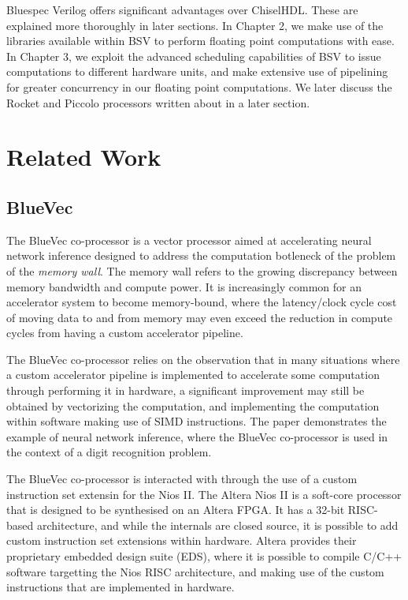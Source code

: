 \documentclass[a4paper,8pt]{report}
\begin{document}
Bluespec Verilog offers significant advantages over ChiselHDL. These are
explained more thoroughly in later sections. In Chapter 2, we make use of the
libraries available within BSV to perform floating point computations with ease.
In Chapter 3, we exploit the advanced scheduling capabilities of BSV to issue
computations to different hardware units, and make extensive use of pipelining
for greater concurrency in our floating point computations. We later discuss the
Rocket and Piccolo processors written about in a later section.

\chapter{Related Work} 
\section{BlueVec}
The BlueVec co-processor is a vector processor aimed at accelerating neural
network inference designed to address the computation botleneck of the problem
of the \emph{memory wall}.
The memory wall refers to the growing discrepancy between memory bandwidth and
compute power. It is increasingly common for an accelerator system to become
memory-bound, where the latency/clock cycle cost of moving data to and from
memory may even exceed the reduction in compute cycles from having a custom
accelerator pipeline.

The BlueVec co-processor relies on the observation that in many situations where
a custom accelerator pipeline is implemented to accelerate some computation
through performing it in hardware, a significant improvement may still be obtained
by vectorizing the computation, and implementing the computation within
software making use of SIMD instructions. The paper demonstrates the example of
neural network inference, where the BlueVec co-processor is used in the context
of a digit recognition problem.

The BlueVec co-processor is interacted with through the use of a custom
instruction set extensin for the Nios II. The Altera Nios II is a soft-core processor
that is designed to be synthesised on an Altera FPGA. It has a 32-bit RISC-based
architecture, and while the internals are closed source, it is possible to add
custom instruction set extensions within hardware. Altera provides their
proprietary embedded design suite (EDS), where it is possible to compile C/C++
software targetting the Nios RISC architecture, and making use of the custom
instructions that are implemented in hardware.
\end{document}
